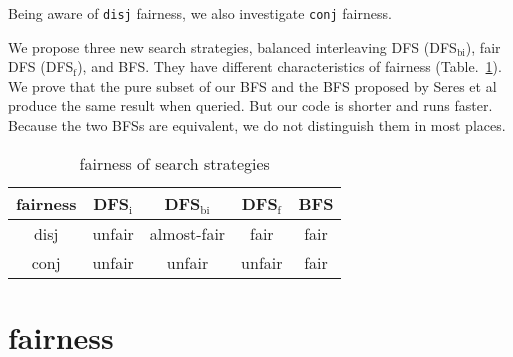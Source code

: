 \documentclass[format=acmlarge, review=true, authordraft=true]{acmart}
\newcommand{\conde}{\texttt{cond$^e$} }
\begin{document}
Being aware of \texttt{disj} fairness, we also investigate \texttt{conj} 
fairness. 

We propose three new search strategies, balanced interleaving DFS (DFS$_\textrm{bi}$), fair 
DFS (DFS$_\textrm{f}$), and BFS. They have different characteristics of fairness 
(Table.~\ref{fairness}). We prove that the pure subset of our BFS and the BFS 
proposed by Seres et
al~\citep{seres1999algebra} produce the same result when queried. But our code 
is shorter and runs faster. Because the two BFSs are equivalent, we do not 
distinguish them in most places.
 
\begin{table}
	\begin{tabular}{|c|c|c|c|c|}
		\hline 
		fairness & DFS$_\textrm{i}$ & DFS$_\textrm{bi}$ & DFS$_\textrm{f}$ & BFS \\ 
		\hline 
		disj & unfair & almost-fair & fair & fair \\ 
		\hline 
		conj & unfair & unfair & unfair & fair \\ 
		\hline 
	\end{tabular} 
	\caption{fairness of search strategies}
	\label{fairness}
\end{table}


\section{fairness}
\end{document}
